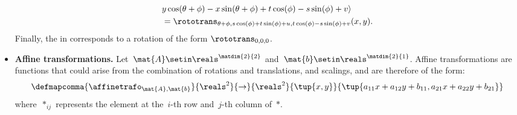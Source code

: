 \begin{solution}
\begin{itemize}
\begin{equation}
\begin{aligned}
                       & y\cos(\theta+\phi)-x\sin(\theta+\phi)+t\cos(\phi)-s\sin(\phi)+v\rangle \\
                       & =\rototrans_{\theta+\phi,s\cos(\phi)+t\sin(\phi)+u, t\cos(\phi)-s\sin(\phi)+v}(x,y).
                  \end{aligned}
              \end{equation}
              Finally, the  in \Draw corresponds to a rotation of the form $\rototrans_{0,0,0}$.
        \item \textbf{Affine transformations.}
              Let~$\mat{A}\setin \reals^{\matdim{2}{2}}$ and~$\mat{b}\setin \reals^{\matdim{2}{1}}$.
              Affine transformations are functions that could arise from the combination of rotations and translations, and scalings, and are therefore of the form:
              \begin{equation}
                  \defmapcomma{
                  \affinetrafo_{\mat{A},\mat{b}}
                  }{
                  \reals^2
                  }{
                  \to
                  }{
                  \reals^2
                  }{
                  \tup{x,y}
                  }{
                  \tup{a_{11}x+a_{12}y+b_{11},a_{21}x+a_{22}y+b_{21}}
                  }
              \end{equation}
              where~$*_{ij}$ represents the element at the~$i$-th row and~$j$-th column of~$*$.


\end{itemize}
\end{solution}

